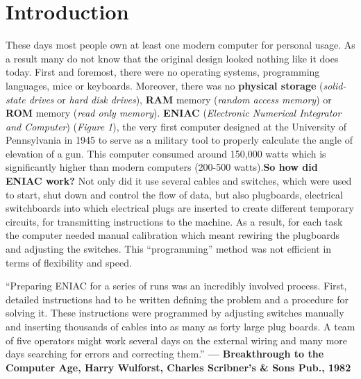 \documentclass[12pt]{article}
\begin{document}
\section{Introduction}
These days most people own at least one modern computer for personal usage. As a result many do not know that the original design looked nothing like it does today.\newline\newline
First and foremost, there were no operating systems, programming languages, mice or keyboards. Moreover, there was no \textbf{physical storage} (\textit{solid-state drives} or \textit{hard disk drives}),
\textbf{RAM} memory (\textit{random access memory}) or \textbf{ROM} memory (\textit{read only memory}). \textbf{ENIAC} (\textit{Electronic Numerical Integrator and Computer}) (\textit{Figure 1}),
the very first computer designed at the University of Pennsylvania in 1945 to serve as a military tool to properly calculate the angle of elevation of a gun. This computer consumed around 150,000 watts
which is significantly higher than modern computers (200-500 watts).\newline\newline \textbf{So how did ENIAC work?}\newline\newline
Not only did it use several cables and switches, which were used to start, shut down and control the flow of data, but also plugboards, electrical switchboards into which electrical plugs are inserted to
create different temporary circuits, for transmitting instructions to the machine. As a result, for each task the computer needed manual calibration which meant rewiring the plugboards and adjusting the switches.
This “programming” method was not efficient in terms of flexibility and speed.



\begin{center}
    \footnotesize“Preparing ENIAC for a series of runs was an incredibly involved process. First, detailed instructions had to be written defining the problem and a procedure for solving it. These instructions were programmed by adjusting switches manually and inserting thousands of cables into as many as forty large plug boards. A team of five operators might work several days on the external wiring and many more days searching for errors and correcting them.”\textbf{ — Breakthrough to the Computer Age, Harry Wulforst, Charles Scribner’s \& Sons Pub., 1982}
\end{center}
\end{document}
